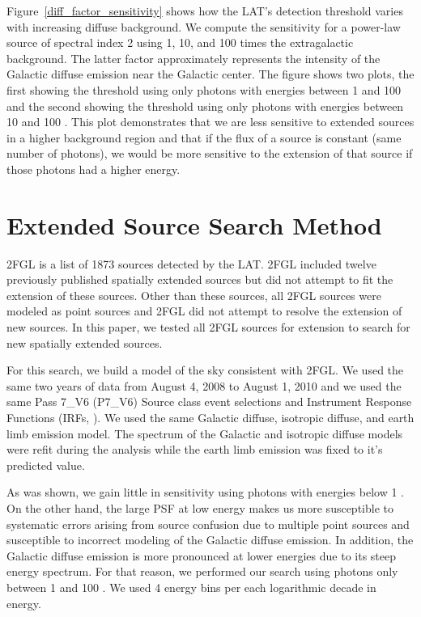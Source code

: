 \documentclass[12pt,preprint]{aastex}
\newcommand{\gev}{\text{GeV}\xspace}
\begin{document}
Figure~\ref{diff_factor_sensitivity} shows how the LAT's detection
threshold varies with increasing diffuse background. We compute the
sensitivity for a power-law source of spectral index 2 using 1, 10, and
100 times the extragalactic background. The latter factor approximately
represents the intensity of the Galactic diffuse emission near the
Galactic center.  The figure shows two plots, the first showing the
threshold using only photons with energies between 1 \gev and 100 \gev and
the second showing the threshold using only photons with energies between
10 \gev and 100 \gev. This plot demonstrates that we are less sensitive
to extended sources in a higher background region and that if the flux of
a source is constant (same number of photons), we would be more sensitive
to the extension of that source if those photons had a higher energy.

\section{Extended Source Search Method}

2FGL is a list of 1873 \gev sources detected by the LAT.  2FGL included
twelve previously published spatially extended sources but did not
attempt to fit the extension of these sources. Other than these sources,
all 2FGL sources were modeled as point sources and 2FGL did not attempt to
resolve the extension of new sources.  In this paper, we tested all 2FGL
sources for extension to search for new spatially extended \gev sources.

For this search, we build a model of the
sky consistent with 2FGL.   We used the same two
years of data from August 4, 2008 to August 1, 2010 and we used the same
Pass 7\_V6 (P7\_V6) Source class event selections and 
Instrument Response Functions (IRFs, \cite{lat_on_orbit_psf}).  We used the same Galactic diffuse,
isotropic diffuse, and earth limb emission model. The spectrum of the
Galactic and isotropic diffuse models were refit during the analysis
while the earth limb emission was fixed to it's predicted value.

As was shown, we gain little in sensitivity using photons with energies
below 1 \gev. On the other hand, the large PSF at low energy makes us
more susceptible to systematic errors arising from source confusion due
to multiple point sources and susceptible to incorrect modeling of the
Galactic diffuse emission. In addition, the Galactic diffuse emission
is more pronounced at lower energies due to its steep energy spectrum.
For that reason, we performed our search using photons only between 1
\gev and 100 \gev.  We used 4 energy bins per each logarithmic decade
in energy.
\end{document}
